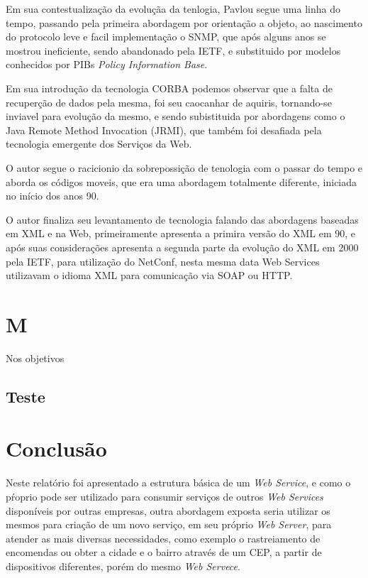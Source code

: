 \documentclass[12pt]{article}
\begin{document}
Em sua contestualização da evoluçãa da tenlogia, Pavlou segue uma linha do tempo, passando pela primeira abordagem por orientação a objeto, ao nascimento do protocolo leve e facil implementação o SNMP, que após alguns anos se mostrou ineficiente, sendo abandonado pela IETF, e substituido por modelos conhecidos por PIBs \textit{Policy Information Base}.

Em sua introdução da tecnologia CORBA podemos observar que a falta de recuperção de dados pela mesma, foi seu caocanhar de aquiris, tornando-se inviavel para evolução da mesmo, e sendo subistituida por abordagens como o Java Remote Method Invocation (JRMI), que também foi desafiada pela tecnologia emergente dos Serviços da Web.

O autor segue o racicionio da sobrepossição de tenologia com o passar do tempo e aborda os códigos moveis, que era uma abordagem totalmente diferente, iniciada no início dos anos 90.

O autor finaliza seu levantamento de tecnologia falando das abordagens baseadas em XML e na Web, primeiramente apresenta a primira versão do XML em 90, e após suas considerações apresenta a segunda parte da evolução do XML em 2000 pela IETF, para utilização do NetConf, nesta mesma data Web Services utilizavam o idioma XML para comunicação via SOAP ou HTTP.      
\section{M}
	Nos objetivos 
	\subsection{Teste}
	
\section*{Conclusão}
Neste relatório foi apresentado a estrutura básica de um \textit{Web Service}, e como o pŕoprio pode ser utilizado para consumir serviços de outros \textit{Web Services} disponíveis por outras empresas, outra abordagem exposta seria utilizar os mesmos para criação de um novo serviço, em seu próprio \textit{Web Server}, para atender as mais diversas necessidades, como exemplo o rastreiamento de encomendas ou obter a cidade e o bairro através de um CEP, a partir de dispositivos diferentes, porém do mesmo \textit{Web Servece}.	  	

\end{document}
